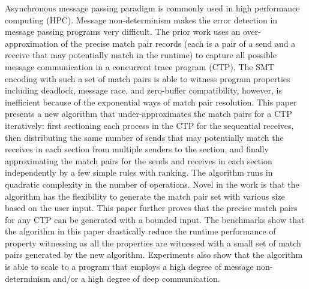 Asynchronous message passing paradigm is commonly used in high performance computing (HPC).
Message non-determinism makes the error detection in message passing programs very difficult. The prior work uses an over-approximation of the precise match pair records (each is a pair of a send and a receive that may potentially match in the runtime) to capture all possible message communication in a concurrent trace program (CTP). The SMT encoding with such a set of match pairs is able to witness program properties including deadlock, message race, and zero-buffer compatibility, however, is inefficient because of the exponential ways of match pair resolution.
This paper presents a new algorithm that under-approximates the match pairs for a CTP iteratively: first sectioning each process in the CTP for the sequential receives, then distributing the same number of sends that may potentially match the receives in each section from multiple senders to the section, and finally approximating the match pairs for the sends and receives in each section independently by a few simple rules with ranking. The algorithm runs in quadratic complexity in the number of operations. Novel in the work is that the algorithm has the flexibility to generate the match pair set with various size based on the user input. This paper further proves that the precise match pairs for any CTP can be generated with a bounded input. The benchmarks show that the algorithm in this paper drastically reduce the runtime performance of property witnessing as all the properties are witnessed with a small set of match pairs generated by the new algorithm. Experiments also show that the algorithm is able to scale to a program that employs a high degree of message non-determinism and/or a high degree of deep communication.